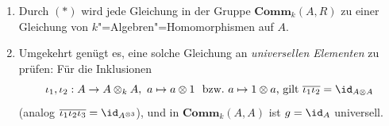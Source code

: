 \documentclass[11pt]{article}
\newcommand{\Comm}{\mathbf{Comm}}
\begin{document}
\begin{note}\mbox{}
    \begin{enumerate}[label=--]
        \item Durch $(*)$ wird jede Gleichung in der Gruppe $\Comm_k(A,R)$ zu einer Gleichung von $k$"=Algebren"=Homomorphismen auf $A$.
        \item Umgekehrt genügt es, eine solche Gleichung an \emph{universellen Elementen} zu prüfen: Für die Inklusionen
        $$\iota_1,\iota_2: A\to A\otimes_k A, \ a\mapsto a\otimes 1 \ \text{ bzw.} \ a\mapsto 1\otimes a\text{, gilt } \overline{\iota_1\iota_2}=\id_{A\otimes A}$$
    (analog $\overline{\iota_1\iota_2\iota_3}=\id_{A^{\otimes 3}}$), und in $\Comm_k(A,A)$ ist $g=\id_A$ universell.
    \end{enumerate} 
\end{note}
\newpage
\end{document}
